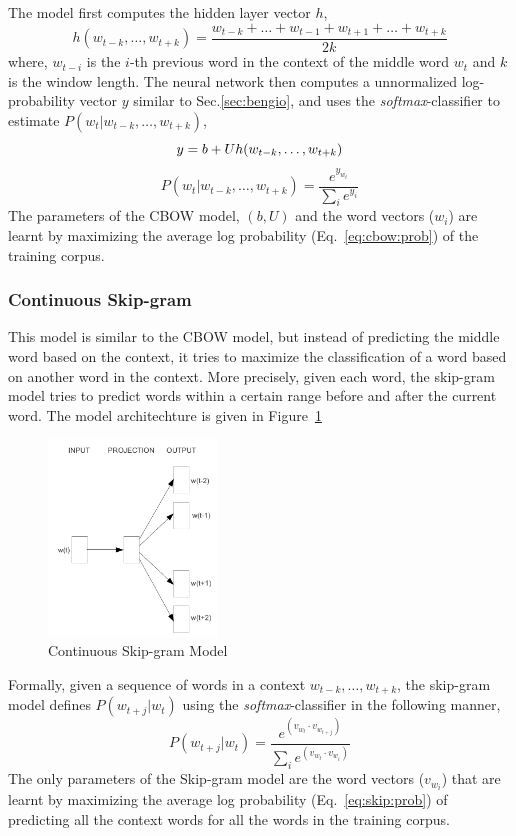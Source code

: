 The model first computes the hidden layer vector $h$, 
\begin{equation}
h(w_{t-k}, \ldots, w_{t+k}) = \frac{w_{t-k} + \ldots + w_{t-1} + w_{t+1} + \dots + w_{t+k}}{2k}
\end{equation}
where, $w_{t-i}$ is the $i$-th previous word in the context of the middle word $w_{t}$ and $k$ is the window length.
The neural network then computes a unnormalized log-probability vector $y$ similar to Sec.\ref{sec:bengio}, and uses the \emph{softmax}-classifier to estimate $P(w_{t}|w_{t-k}, \ldots, w_{t+k})$,
\begin{equation}
y = b + Uh(w_{t-k}, \ldots, w_{t+k})\\
\end{equation}
\begin{equation}
\label{eq:cbow:prob}
P(w_{t}|w_{t-k}, \ldots, w_{t+k}) = \frac{e^{y_{w_t}}}{\sum_{i} e^{y_{i}}}
\end{equation}
The parameters of the CBOW model, $(b, U)$ and the word vectors ($w_{i}$) are learnt by maximizing the average log probability (Eq.~\ref{eq:cbow:prob}) of the training corpus.

\subsubsection{Continuous Skip-gram}
This model is similar to the CBOW model, but instead of predicting the middle word based on the context, it tries to maximize the classification of a word based on another word in the context. More precisely, given each word, the skip-gram model tries to predict words within a certain range before and after the current word. The model architechture is given in Figure~\ref{fig:nn:skip}
\begin{figure}[h!]
    \centering
        \includegraphics[width=0.4\textwidth]{figs/mikolov_skip.png}
    \caption{Continuous Skip-gram Model }
    \label{fig:nn:skip}
\end{figure}
Formally, given a sequence of words in a context $w_{t-k}, \ldots, w_{t+k}$, the skip-gram model defines $P(w_{t+j}|w_{t})$ using the \emph{softmax}-classifier in the following manner,
\begin{equation}
\label{eq:skip:prob}
P(w_{t+j}|w_{t}) = \frac{e^{(v_{w_{t}} \cdot v_{w_{t+j}} )} }{\sum_{i} e^{(v_{w_{t}} \cdot v_{w_{i}})} }
\end{equation}
The only parameters of the Skip-gram model are the word vectors ($v_{w_{i}}$) that are learnt by maximizing the average log probability (Eq.~\ref{eq:skip:prob}) of predicting all the context words for all the words in the training corpus.

